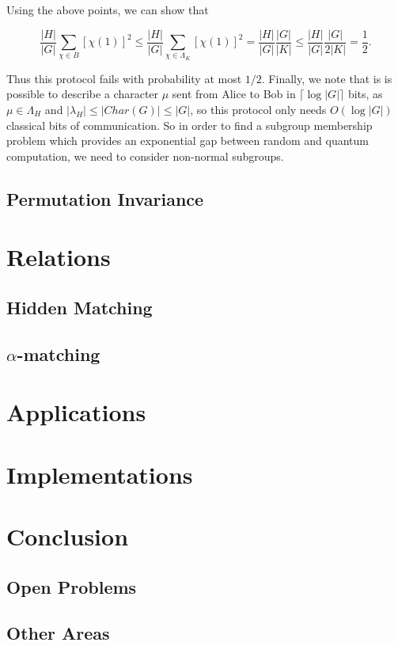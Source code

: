 \documentclass[a4paper]{article}
\begin{document}
        Using the above points, we can show that

        $$\frac{|H|}{|G|}\sum_{\chi \in B}[\chi(1)]^2 \leq \frac{|H|}{|G|}\sum_{\chi \in \Lambda_K}[\chi(1)]^2 = \frac{|H|}{|G|}\frac{|G|}{|K|} \leq \frac{|H|}{|G|}\frac{|G|}{2|K|} = \frac{1}{2}.$$

        Thus this protocol fails with probability at most $1/2$. Finally, we note that is is possible to describe a character $\mu$ sent from Alice to Bob in $\lceil\log|G|\rceil$ bits, as $\mu \in \Lambda_H$ and $|\lambda_H| \leq |Char(G)| \leq |G|$, so this protocol only needs $O(\log |G|)$ classical bits of communication. So in order to find a subgroup membership problem which provides an exponential gap between random and quantum computation, we need to consider non-normal subgroups.

        \subsection{Permutation Invariance}

    \section{Relations}

        \subsection{Hidden Matching}

        \subsection{$\alpha$-matching}

    \section{Applications}

    \section{Implementations}

    \section{Conclusion}

        \subsection{Open Problems}

        \subsection{Other Areas}

    
    {}
\end{document}
